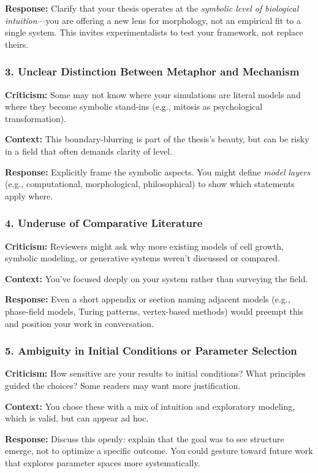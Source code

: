 \textbf{Response:} Clarify that your thesis operates at the \textit{symbolic level of biological intuition}—you are offering a new lens for morphology, not an empirical fit to a single system. This invites experimentalists to test your framework, not replace theirs.

\subsubsection*{3. Unclear Distinction Between Metaphor and Mechanism}
\textbf{Criticism:} Some may not know where your simulations are literal models and where they become symbolic stand-ins (e.g., mitosis as psychological transformation).

\textbf{Context:} This boundary-blurring is part of the thesis’s beauty, but can be risky in a field that often demands clarity of level.

\textbf{Response:} Explicitly frame the symbolic aspects. You might define \textit{model layers} (e.g., computational, morphological, philosophical) to show which statements apply where.

\subsubsection*{4. Underuse of Comparative Literature}
\textbf{Criticism:} Reviewers might ask why more existing models of cell growth, symbolic modeling, or generative systems weren’t discussed or compared.

\textbf{Context:} You’ve focused deeply on your system rather than surveying the field.

\textbf{Response:} Even a short appendix or section naming adjacent models (e.g., phase-field models, Turing patterns, vertex-based methods) would preempt this and position your work in conversation.

\subsubsection*{5. Ambiguity in Initial Conditions or Parameter Selection}
\textbf{Criticism:} How sensitive are your results to initial conditions? What principles guided the choices? Some readers may want more justification.

\textbf{Context:} You chose these with a mix of intuition and exploratory modeling, which is valid, but can appear ad hoc.

\textbf{Response:} Discuss this openly: explain that the goal was to see structure emerge, not to optimize a specific outcome. You could gesture toward future work that explores parameter spaces more systematically.

